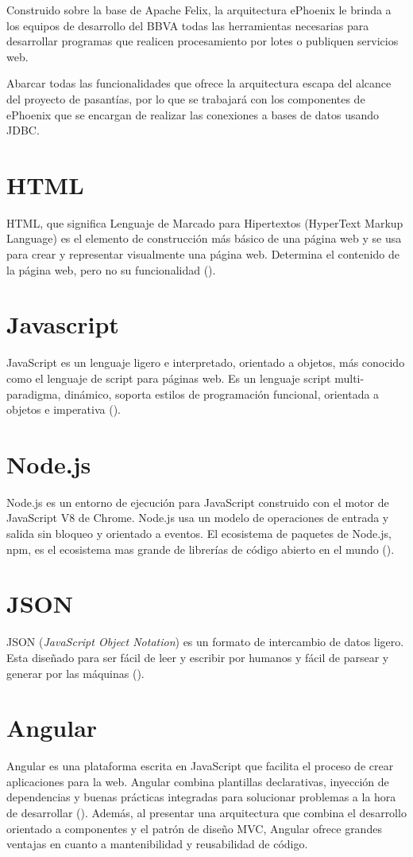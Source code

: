 Construido sobre la base de Apache Felix, la arquitectura ePhoenix le brinda a los
equipos de desarrollo del BBVA todas las herramientas necesarias para desarrollar programas
que realicen procesamiento por lotes o publiquen servicios web.

Abarcar todas las funcionalidades que ofrece la arquitectura escapa del alcance del
proyecto de pasantías, por lo que se trabajará con los componentes de ePhoenix
que se encargan de realizar las conexiones a bases de datos usando JDBC.

\section{HTML}

HTML, que significa Lenguaje de Marcado para Hipertextos (HyperText Markup Language)
es el elemento de construcción más básico de una página web y se usa para crear y
representar visualmente una página web. Determina el contenido de la página web,
pero no su funcionalidad (\cite{HTML}).

\section{Javascript}

JavaScript es un lenguaje ligero e interpretado, orientado a objetos, más conocido
como el lenguaje de script para páginas web. Es un lenguaje script multi-paradigma, dinámico,
soporta estilos de programación funcional, orientada a objetos e imperativa (\cite{JS}).

\section{Node.js}
Node.js es un entorno de ejecución para JavaScript construido con el motor de JavaScript V8
de Chrome. Node.js usa un modelo de operaciones de entrada y salida sin bloqueo y orientado a eventos.
El ecosistema de paquetes de Node.js, npm, es el ecosistema mas grande de librerías
de código abierto en el mundo (\cite{NODE}).

\section{JSON}
JSON (\emph{JavaScript Object Notation}) es un formato de intercambio de datos ligero.
Esta diseñado para ser fácil de leer y escribir por humanos y fácil de parsear y generar
por las máquinas (\cite{JSON}).

\section{Angular}
Angular es una plataforma escrita en JavaScript que facilita el proceso
de crear aplicaciones para la web. Angular combina plantillas declarativas, inyección de dependencias
y buenas prácticas integradas para solucionar problemas a la hora de desarrollar (\cite{ANGULAR}).
Además, al presentar una arquitectura que combina el desarrollo orientado a componentes
y el patrón de diseño MVC, Angular ofrece grandes ventajas en cuanto a mantenibilidad
y reusabilidad de código.

